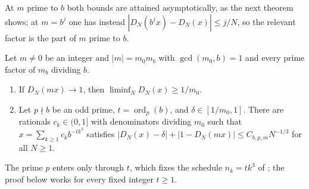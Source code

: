 \documentclass[11pt]{article}
\DeclareMathOperator{\ord}{ord}
\begin{document}
At $m$ prime to $b$ both bounds are attained asymptotically, as the next theorem shows; at $m=b^j$ one
has instead $|D_N(b^jx)-D_N(x)|\le j/N$, so the relevant factor is the part of $m$ prime to $b$.

\begin{theorem}\label{thm:boundary}
Let $m\ne0$ be an integer and $|m|=m_0m_b$ with $\gcd(m_0,b)=1$ and every prime factor of $m_b$ dividing
$b$.
\begin{enumerate}[label=\textup{(\alph*)},nosep]
\item If $D_N(mx)\to1$, then $\liminf_ND_N(x)\ge1/m_0$.
\item Let $p\nmid b$ be an odd prime, $t=\ord_p(b)$, and $\delta\in[1/m_0,1]$. There are rationals
$c_k\in(0,1]$ with denominators dividing $m_0$ such that $x=\sum_{k\ge1}c_kb^{-tk^3}$ satisfies
$|D_N(x)-\delta|+|1-D_N(mx)|\le C_{b,p,m}N^{-1/3}$ for all $N\ge1$.
\end{enumerate}
The prime $p$ enters only through $t$, which fixes the schedule $n_k=tk^3$ of ;
the proof below works for every fixed integer $t\ge1$.
\end{theorem}
\end{document}
